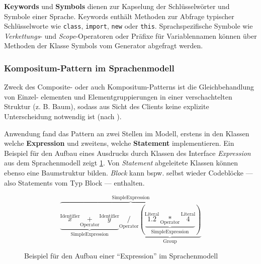 \textbf{Keywords} und \textbf{Symbols} dienen zur Kapselung der Schlüsselwörter und Symbole einer Sprache. Keywords enthält Methoden zur Abfrage typischer Schlüsselworte wie \texttt{class}, \texttt{import}, \texttt{new} oder \texttt{this}. Sprachspezifische Symbole wie \emph{Verkettungs}- und \emph{Scope}-Operatoren oder Präfixe für Variablennamen können über Methoden der Klasse Symbols vom Generator abgefragt werden.

\subsubsection{Kompositum-Pattern im Sprachenmodell}
\label{sec:composite_pattern}

Zweck des Composite- oder auch Kompositum-Patterns ist die Gleichbehandlung von Einzel-
elementen und Elementgruppierungen in einer verschachtelten Struktur
(z. B. Baum), sodass aus Sicht des Clients keine explizite Unterscheidung
notwendig ist (nach \cite[][S. 102]{patternsKompakt}).

Anwendung fand das Pattern an zwei Stellen im Modell, erstens in den Klassen welche \textbf{Expression} und zweitens, welche \textbf{Statement} implementieren.
Ein Beispiel für den Aufbau eines Ausdrucks durch Klassen des Interface \emph{Expression} aus dem Sprachenmodell zeigt \cref{fig:example_expression}. Von \emph{Statement} abgeleitete Klassen können ebenso eine Baumstruktur bilden. \emph{Block} kann bspw. selbst wieder Codeblöcke --- also Statements vom Typ Block --- enthalten. 

\begin{figure}
    \[
        \overbrace{
            \underbrace{
                \overset{\text{Identifier}}{x} \underset{\text{Operator}}{+} \overset{\text{Identifier}}{y}
            }_{\text{SimpleExpression}} 
            \underset{\text{Operator}}{/}
            \underbrace{
                ( 
                    \underbrace{
                        \overset{\text{Literal}}{1.2} \underset{\text{Operator}}{*} \overset{\text{Literal}}{4}
                    }_{\text{SimpleExpression}} 
                )
            }_{\text{Group}}
        }^{\text{SimpleExpression}} 
    \]   
    \caption{Beispiel für den Aufbau einer \enquote{Expression} im Sprachenmodell}
    \label{fig:example_expression}
\end{figure}
